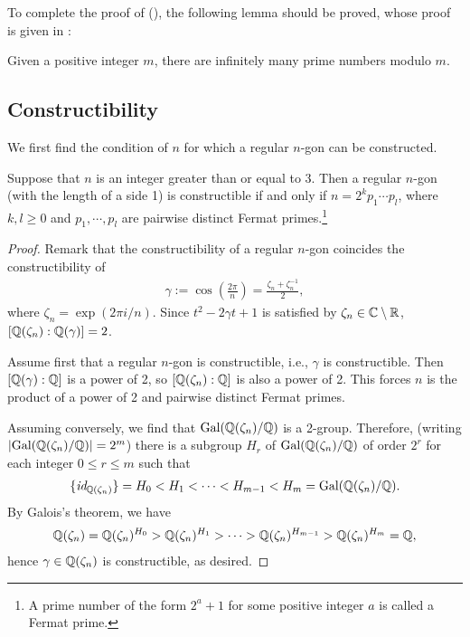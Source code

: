 To complete the proof of (), the following lemma should be proved, whose proof is given in :
\begin{lem}\label{infinitely many primes modulo an integer}
    Given a positive integer $m$, there are infinitely many prime numbers modulo $m$.
\end{lem}

\subsection{Constructibility}
We first find the condition of $n$ for which a regular $n$-gon can be constructed.
\begin{thm}
    Suppose that $n$ is an integer greater than or equal to 3.
    Then a regular $n$-gon (with the length of a side 1) is constructible if and only if $n=2^k p_1\cdots p_l$, where $k, l\geq 0$ and $p_1, \cdots, p_l$ are pairwise distinct Fermat primes.\footnote{A prime number of the form $2^a+1$ for some positive integer $a$ is called a Fermat prime.}
\end{thm}
\begin{proof}
    Remark that the constructibility of a regular $n$-gon coincides the constructibility of
    \begin{align*}
        \gamma:=\cos\left(\frac{2\pi}{n}\right)=\frac{\zeta_n+\zeta_n^{-1}}{2},
    \end{align*}
    where $\zeta_n=\exp(2\pi i/n)$.
    Since $t^2-2\gamma t+1$ is satisfied by $\zeta_n\in{\mathbb{C}}\setminus{\mathbb{R}}$, $[{\mathbb{Q}}(\zeta_n):{\mathbb{Q}}(\gamma)]=2$.

    Assume first that a regular $n$-gon is constructible, i.e., $\gamma$ is constructible.
    Then $[{\mathbb{Q}}(\gamma): {\mathbb{Q}}]$ is a power of 2, so $[{\mathbb{Q}}(\zeta_n):{\mathbb{Q}}]$ is also a power of 2.
    This forces $n$ is the product of a power of 2 and pairwise distinct Fermat primes.

    Assuming conversely, we find that ${\textrm{Gal}({{\mathbb{Q}}(\zeta_n)/{\mathbb{Q}}})}$ is a 2-group.
    Therefore, (writing $|{\textrm{Gal}({{\mathbb{Q}}(\zeta_n)/{\mathbb{Q}}})}|=2^m$) there is a subgroup $H_r$ of ${\textrm{Gal}({{\mathbb{Q}}(\zeta_n)/{\mathbb{Q}}})}$ of order $2^r$ for each integer $0\leq r\leq m$ such that
    \begin{align*}
        \{\textit{id}_{{\mathbb{Q}}(\zeta_n)}\}=H_0<H_1<\cdots<H_{m-1}<H_m={\textrm{Gal}({{\mathbb{Q}}(\zeta_n)/{\mathbb{Q}}})}.
    \end{align*}
    By Galois's theorem, we have
    \begin{align*}
        {\mathbb{Q}}(\zeta_n)={\mathbb{Q}}(\zeta_n)^{H_0}>{\mathbb{Q}}(\zeta_n)^{H_1}>\cdots>{\mathbb{Q}}(\zeta_n)^{H_{m-1}}>{\mathbb{Q}}(\zeta_n)^{H_m}={\mathbb{Q}},
    \end{align*}
    hence $\gamma\in{\mathbb{Q}}(\zeta_n)$ is constructible, as desired.
\end{proof}

